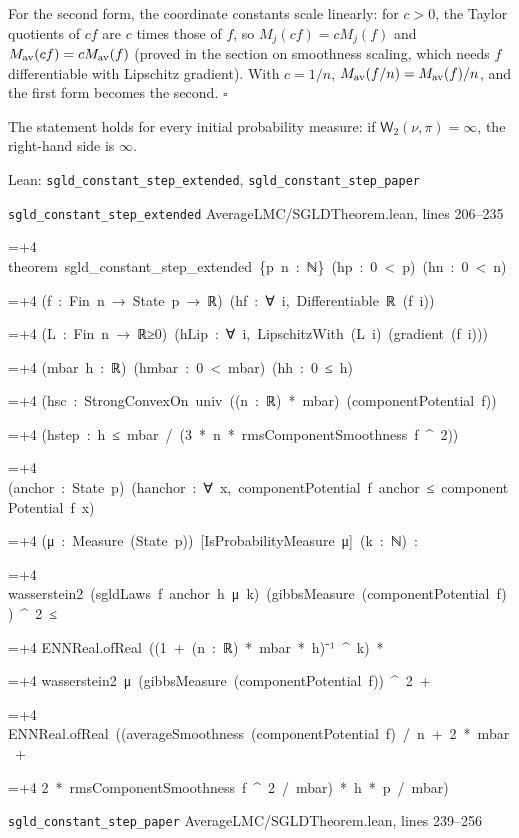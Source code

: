 \documentclass[11pt,a4paper]{article}
\newlength{\leancharwidth}
\newenvironment{leancode}{\par\smallskip\begingroup\ttfamily\footnotesize\raggedright
  \settowidth{\leancharwidth}{M}\setlength{\parskip}{0pt}\setlength{\parindent}{0pt}
  \frenchspacing}{\par\endgroup\smallskip}
\newcommand{\leanline}[2]{\hangindent=\dimexpr#1\leancharwidth+4\leancharwidth\relax
  \hangafter=1\noindent\hspace*{#1\leancharwidth}#2\par}
\newcommand{\leansource}[1]{\par{\footnotesize\color{leanmuted}#1}\par}
\begin{document}
For the second form, the coordinate constants scale linearly: for \(c>0\), the Taylor quotients of \(cf\) are \(c\) times those of \(f\), so \(M_j(cf)=cM_j(f)\) and \(M_{\rm av}(cf)=cM_{\rm av}(f)\) (proved in the section on smoothness scaling, which needs \(f\) differentiable with Lipschitz gradient). With \(c=1/n\), \(M_{\rm av}(f/n)=M_{\rm av}(f)/n\), and the first form becomes the second. \(\square\)




The statement holds for every initial probability measure: if \(\mathsf W_2(\nu,\pi)=\infty\), the right-hand side is \(\infty\).

\begin{leanbox}{Lean: \texttt{sgld\_\allowbreak{}constant\_\allowbreak{}step\_\allowbreak{}extended}, \texttt{sgld\_\allowbreak{}constant\_\allowbreak{}step\_\allowbreak{}paper}}
\leansource{\texttt{sgld\_\allowbreak{}constant\_\allowbreak{}step\_\allowbreak{}extended} \quad AverageLMC/\allowbreak{}SGLDTheorem.lean, lines 206–235}
\begin{leancode}
\leanline{0}{theorem\ sgld\_constant\_step\_extended\ \{p\ n\ :\ ℕ\}\ (hp\ :\ 0\ <\ p)\ (hn\ :\ 0\ <\ n)}
\leanline{4}{(f\ :\ Fin\ n\ →\ State\ p\ →\ ℝ)\ (hf\ :\ ∀\ i,\ Differentiable\ ℝ\ (f\ i))}
\leanline{4}{(L\ :\ Fin\ n\ →\ ℝ≥0)\ (hLip\ :\ ∀\ i,\ LipschitzWith\ (L\ i)\ (gradient\ (f\ i)))}
\leanline{4}{(mbar\ h\ :\ ℝ)\ (hmbar\ :\ 0\ <\ mbar)\ (hh\ :\ 0\ ≤\ h)}
\leanline{4}{(hsc\ :\ StrongConvexOn\ univ\ ((n\ :\ ℝ)\ *\ mbar)\ (componentPotential\ f))}
\leanline{4}{(hstep\ :\ h\ ≤\ mbar\ /\ (3\ *\ n\ *\ rmsComponentSmoothness\ f\ \textasciicircum{}\ 2))}
\leanline{4}{(anchor\ :\ State\ p)\ (hanchor\ :\ ∀\ x,\ componentPotential\ f\ anchor\ ≤\ componentPotential\ f\ x)}
\leanline{4}{(μ\ :\ Measure\ (State\ p))\ [IsProbabilityMeasure\ μ]\ (k\ :\ ℕ)\ :}
\leanline{4}{wasserstein2\ (sgldLaws\ f\ anchor\ h\ μ\ k)\ (gibbsMeasure\ (componentPotential\ f))\ \textasciicircum{}\ 2\ ≤}
\leanline{6}{ENNReal.ofReal\ ((1\ +\ (n\ :\ ℝ)\ *\ mbar\ *\ h)⁻¹\ \textasciicircum{}\ k)\ *}
\leanline{8}{wasserstein2\ μ\ (gibbsMeasure\ (componentPotential\ f))\ \textasciicircum{}\ 2\ +}
\leanline{6}{ENNReal.ofReal\ ((averageSmoothness\ (componentPotential\ f)\ /\ n\ +\ 2\ *\ mbar\ +}
\leanline{8}{2\ *\ rmsComponentSmoothness\ f\ \textasciicircum{}\ 2\ /\ mbar)\ *\ h\ *\ p\ /\ mbar)}
\end{leancode}
\leansource{\texttt{sgld\_\allowbreak{}constant\_\allowbreak{}step\_\allowbreak{}paper} \quad AverageLMC/\allowbreak{}SGLDTheorem.lean, lines 239–256}
\begin{leancode}

\end{leancode}
\end{leanbox}
\end{document}
